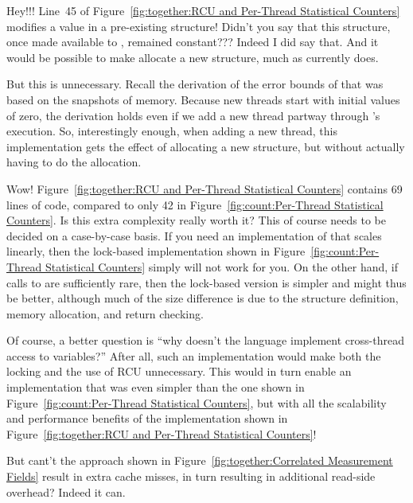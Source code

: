 \QuickQ{}
	Hey!!!
	Line~45 of
	Figure~\ref{fig:together:RCU and Per-Thread Statistical Counters}
	modifies a value in a pre-existing  structure!
	Didn't you say that this structure, once made available to
	, remained constant???
\QuickA{}
	Indeed I did say that.
	And it would be possible to make 
	allocate a new structure, much as 
	currently does.

	But this is unnecessary.
	Recall the derivation of the error bounds of 
	that was based on the snapshots of memory.
	Because new threads start with initial  values of
	zero, the derivation holds even if we add a new thread partway
	through 's execution.
	So, interestingly enough, when adding a new thread, this
	implementation gets the effect of allocating a new structure,
	but without actually having to do the allocation.

\QuickQ{}
	Wow!
	Figure~\ref{fig:together:RCU and Per-Thread Statistical Counters}
	contains 69 lines of code, compared to only 42 in
	Figure~\ref{fig:count:Per-Thread Statistical Counters}.
	Is this extra complexity really worth it?
\QuickA{}
	This of course needs to be decided on a case-by-case basis.
	If you need an implementation of  that
	scales linearly, then the lock-based implementation shown in
	Figure~\ref{fig:count:Per-Thread Statistical Counters}
	simply will not work for you.
	On the other hand, if calls to  are sufficiently
	rare, then the lock-based version is simpler and might thus be
	better, although much of the size difference is due
	to the structure definition, memory allocation, and 
	return checking.

	Of course, a better question is ``why doesn't the language
	implement cross-thread access to  variables?''
	After all, such an implementation would make both the locking
	and the use of RCU unnecessary.
	This would in turn enable an implementation that
	was even simpler than the one shown in
	Figure~\ref{fig:count:Per-Thread Statistical Counters}, but
	with all the scalability and performance benefits of the
	implementation shown in
	Figure~\ref{fig:together:RCU and Per-Thread Statistical Counters}!

\QuickQ{}
	But cant't the approach shown in
	Figure~\ref{fig:together:Correlated Measurement Fields}
	result in extra cache misses, in turn resulting in additional
	read-side overhead?
\QuickA{}
	Indeed it can.

